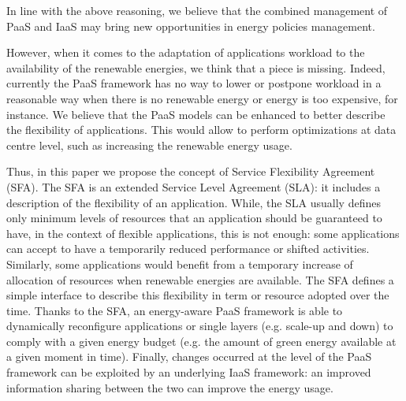 In line with the above reasoning, we believe that the combined management of PaaS and IaaS may bring new opportunities in energy policies management.

However, when it comes to the adaptation of applications workload to the availability of the renewable energies, we think that a piece is missing.
Indeed, currently the PaaS framework has no way to lower or postpone workload in a reasonable way when there is no renewable energy or energy is too expensive, for instance.
We believe that the PaaS models can be enhanced to better describe the flexibility of applications.
This would allow to perform optimizations at data centre level, such as increasing the renewable energy usage.

Thus, in this paper we propose the concept of Service Flexibility Agreement (SFA). 
The SFA is an extended Service Level Agreement (SLA): it includes a description of the flexibility of an application.
While, the SLA usually defines only minimum levels of resources that an application should be guaranteed to have, in the context of flexible applications, this is not enough: some applications can accept to have a temporarily reduced performance or shifted activities.
Similarly, some applications would benefit from a temporary increase of allocation of resources when renewable energies are available.
The SFA defines a simple interface to describe this flexibility in term or resource adopted over the time. 
Thanks to the SFA, an energy-aware PaaS framework is able to dynamically reconfigure applications or single layers (e.g. scale-up and down) to comply with a given energy budget (e.g. the amount of green energy available at a given moment in time).
Finally, changes occurred at the level of the PaaS framework can be exploited by an underlying IaaS framework: an improved information sharing between the two can improve the energy usage.



